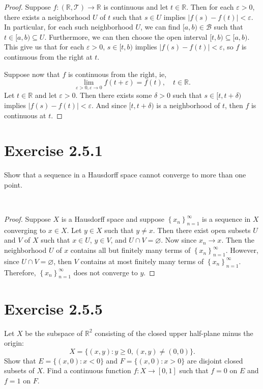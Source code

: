 \documentclass[12pt]{article}
\newenvironment{problem}
    {\begin{lrbox}{\mybox}\begin{minipage}{\textwidth-10pt}}
    {\end{minipage}\end{lrbox}\framebox[6.5in]{\usebox{\mybox}}\\}
\newcommand{\seq}[2]{\left\{#1\right\}_{#2=1}^\infty}
\newcommand{\R}{\mathbb{R}}
\let\eps\varepsilon
\let\emptyset\varnothing
\newcommand{\T}{\mathscr{T}}
\newcommand{\B}{\mathscr{B}}
\begin{document}
\begin{proof}
    Suppose $f:(\R,\T)\to\R$ is continuous and let $t\in\R$. Then for each $\eps>0$, there exists a neighborhood $U$ of $t$ such that $s\in U$ implies $|f(s)-f(t)|<\eps$. In particular, for each such neighborhood $U$, we can find $[a,b)\in\B$ such that $t\in[a,b)\subseteq U$. Furthermore, we can then choose the open interval $[t,b)\subseteq[a,b)$. This give us that for each $\eps>0$, $s\in[t,b)$ implies $|f(s)-f(t)|<\eps$, so $f$ is continuous from the right at $t$.
    
    Suppose now that $f$ is continuous from the right, ie,
    \[\lim_{\eps>0, \eps\to0}f(t+\eps) = f(t), \quad t\in\R.\]
    Let $t\in\R$ and let $\eps>0$. Then there exists some $\delta>0$ such that $s\in[t,t+\delta)$ implies $|f(s)-f(t)|<\eps$. And since $[t,t+\delta)$ is a neighborhood of $t$, then $f$ is continuous at $t$.
    
\end{proof}

\section*{Exercise 2.5.1}
\begin{problem}
    Show that a sequence in a Hausdorff space cannot converge to more than one point.
\end{problem}

\begin{proof}
    Suppose $X$ is a Hausdorff space and suppose $\seq{x_n}{n}$ is a sequence in $X$ converging to $x\in X$. Let $y\in X$ such that $y\ne x$. Then there exist open subsets $U$ and $V$ of $X$ such that $x\in U$, $y\in V$, and $U\cap V=\emptyset$. Now since $x_n\to x$. Then the neighborhood $U$ of $x$ contains all but finitely many terms of $\seq{x_n}{n}$. However, since $U\cap V=\emptyset$, then $V$ contains at most finitely many terms of $\seq{x_n}{n}$. Therefore, $\seq{x_n}{n}$ does not converge to $y$.
    
\end{proof}

\section*{Exercise 2.5.5}
\begin{problem}
    Let $X$ be the subspace of $\R^2$ consisting of the closed upper half-plane minus the origin:
    \[X=\{(x,y) : y\geq 0, (x,y)\ne(0,0)\}.\]
    Show that $E=\{(x,0) : x<0\}$ and $F=\{(x,0) : x>0\}$ are disjoint closed subsets of $X$. Find a continuous function $f:X\to[0,1]$ such that $f=0$ on $E$ and $f=1$ on $F$.
\end{problem}
\end{document}
